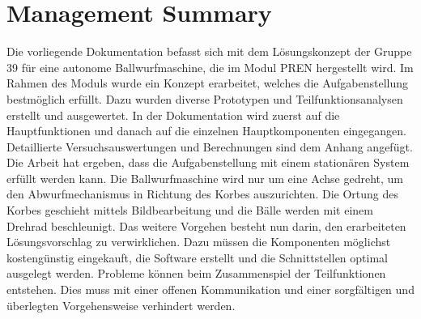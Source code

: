\section{Management Summary}
Die vorliegende Dokumentation befasst sich mit dem Lösungskonzept der Gruppe 39 für eine autonome Ballwurfmaschine, die im Modul PREN hergestellt wird. 
Im Rahmen des Moduls wurde ein Konzept erarbeitet, welches die Aufgabenstellung bestmöglich erfüllt. Dazu wurden diverse Prototypen und Teilfunktionsanalysen erstellt und ausgewertet. In der Dokumentation wird zuerst auf die Hauptfunktionen und danach auf die einzelnen Hauptkomponenten eingegangen. Detaillierte Versuchsauswertungen und Berechnungen sind dem Anhang angefügt.  
Die Arbeit hat ergeben, dass die Aufgabenstellung mit einem stationären System erfüllt werden kann. Die Ballwurfmaschine wird nur um eine Achse gedreht, um den Abwurfmechanismus in Richtung des Korbes auszurichten. Die Ortung des Korbes geschieht mittels Bildbearbeitung und die Bälle werden mit einem Drehrad beschleunigt. 
Das weitere Vorgehen besteht nun darin, den erarbeiteten Lösungsvorschlag zu verwirklichen. Dazu müssen die Komponenten möglichst kostengünstig eingekauft, die Software erstellt und die Schnittstellen optimal ausgelegt werden. Probleme können beim Zusammenspiel der Teilfunktionen entstehen. Dies muss mit einer offenen Kommunikation und einer sorgfältigen und überlegten Vorgehensweise verhindert werden. 
